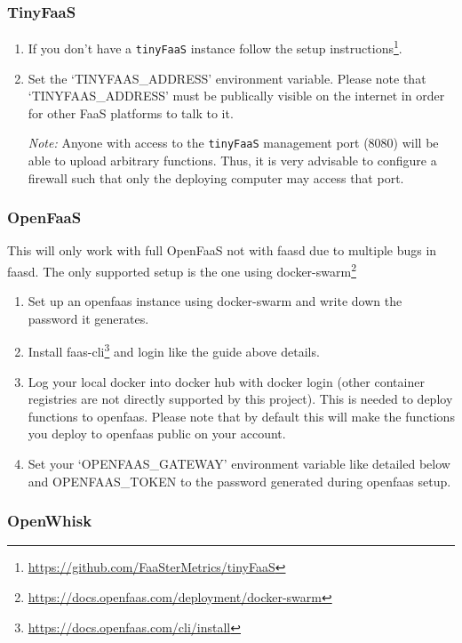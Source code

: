\documentclass[../main.tex]{subfiles}
\begin{document}
\subsubsection{TinyFaaS}\label{sec:providersetuptinyfaas}

\begin{enumerate}
  \item If you don't have a \texttt{tinyFaaS} instance follow the setup instructions\footnote{\url{https://github.com/FaaSterMetrics/tinyFaaS}}.
\item Set the `TINYFAAS\_ADDRESS' environment variable. 
  Please note that `TINYFAAS\_ADDRESS' must be publically visible on the internet in order for other FaaS platforms to talk to it. 

  \textit{Note:} Anyone with access to the \texttt{tinyFaaS} management port (8080) will be able to upload arbitrary functions. 
  Thus, it is very advisable to configure a firewall such that only the deploying computer may access that port.

\end{enumerate}

\subsubsection{OpenFaaS}\label{sec:providersetupopenfaas}
This will only work with full OpenFaaS not with faasd due to multiple bugs in faasd.
The only supported setup is the one using docker-swarm\footnote{\url{https://docs.openfaas.com/deployment/docker-swarm}}
\begin{enumerate}
\item Set up an openfaas instance using docker-swarm and write down the password it generates.
\item Install faas-cli\footnote{\url{https://docs.openfaas.com/cli/install}} and login like the guide above details.
\item Log your local docker into docker hub with docker login (other container registries are not directly supported by this project).
This is needed to deploy functions to openfaas. Please note that by default this will make the functions you deploy to openfaas public on your account.
\item Set your `OPENFAAS\_GATEWAY' environment variable like detailed below and OPENFAAS\_TOKEN to the password generated during openfaas setup.
\end{enumerate}

\subsubsection{OpenWhisk}\label{sec:providersetupopenwhisk}
\end{document}
